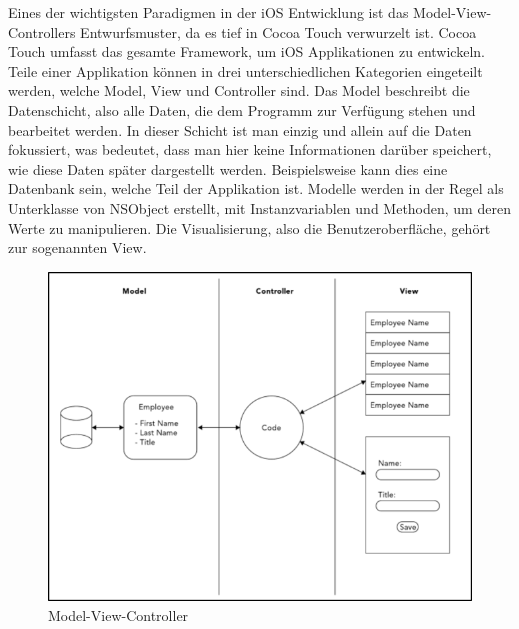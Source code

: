 \documentclass[11pt,a4paper]{report}
\begin{document}
Eines der wichtigsten Paradigmen in der iOS Entwicklung ist das Model-View-Controllers Entwurfsmuster, da es tief in Cocoa Touch verwurzelt ist. Cocoa Touch umfasst das gesamte Framework, um iOS Applikationen zu entwickeln. Teile einer Applikation können in drei unterschiedlichen Kategorien eingeteilt werden, welche Model, View und Controller sind. Das Model beschreibt die Datenschicht, also alle Daten, die dem Programm zur Verfügung stehen und bearbeitet werden. In dieser Schicht ist man einzig und allein auf die Daten fokussiert, was bedeutet, dass man hier keine Informationen darüber speichert, wie diese Daten später dargestellt werden. Beispielsweise kann dies eine Datenbank sein, welche Teil der Applikation ist. Modelle werden in der Regel als Unterklasse von NSObject erstellt, mit Instanzvariablen und Methoden, um deren Werte zu manipulieren. Die Visualisierung, also die Benutzeroberfläche, gehört zur sogenannten View. 
\begin{figure}[h]
\begin{center}
\includegraphics[scale=1.1]{./images/19.png}
\caption{Model-View-Controller \cite{harris2014beginning}}
\label{model_view_controller}
\end{center}
\end{figure}
\end{document}
